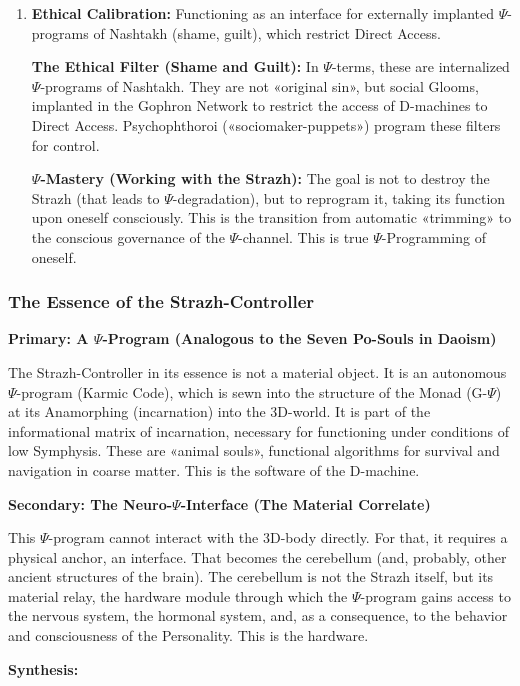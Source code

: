 \documentclass[a4paper,12pt]{article}
\begin{document}
\begin{enumerate}
		\item \textbf{Ethical Calibration:} Functioning as an interface for externally implanted $\Psi$-programs of Nashtakh (shame, guilt), which restrict Direct Access.
		
		\textbf{The Ethical Filter (Shame and Guilt):} In $\Psi$-terms, these are internalized $\Psi$-programs of Nashtakh. They are not «original sin», but social Glooms, implanted in the Gophron Network to restrict the access of D-machines to Direct Access. Psychophthoroi («sociomaker-puppets») program these filters for control.
		
		\textbf{$\Psi$-Mastery (Working with the Strazh):} The goal is not to destroy the Strazh (that leads to $\Psi$-degradation), but to reprogram it, taking its function upon oneself consciously. This is the transition from automatic «trimming» to the conscious governance of the $\Psi$-channel. This is true $\Psi$-Programming of oneself.
	\end{enumerate}
	
	\subsubsection{The Essence of the Strazh-Controller}
	
	\textbf{Primary: A $\Psi$-Program (Analogous to the Seven Po-Souls in Daoism)}
	
	The Strazh-Controller in its essence is not a material object. It is an autonomous $\Psi$-program (Karmic Code), which is sewn into the structure of the Monad (G-$\Psi$) at its Anamorphing (incarnation) into the 3D-world. It is part of the informational matrix of incarnation, necessary for functioning under conditions of low Symphysis. These are «animal souls», functional algorithms for survival and navigation in coarse matter. This is the software of the D-machine.
	
	\textbf{Secondary: The Neuro-$\Psi$-Interface (The Material Correlate)}
	
	This $\Psi$-program cannot interact with the 3D-body directly. For that, it requires a physical anchor, an interface. That becomes the cerebellum (and, probably, other ancient structures of the brain). The cerebellum is not the Strazh itself, but its material relay, the hardware module through which the $\Psi$-program gains access to the nervous system, the hormonal system, and, as a consequence, to the behavior and consciousness of the Personality. This is the hardware.
	
	\textbf{Synthesis:}
	
\end{document}
